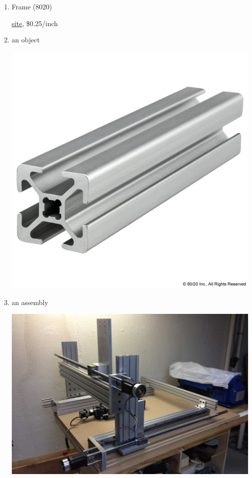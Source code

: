\documentclass[11pt]{article}
\begin{document}
\begin{enumerate}
\item Frame (8020)
\label{sec:org75d7a8b}

\href{https://8020.net/20-2020.html}{site}, \$0.25/inch


\item an object
\label{sec:orgd5b63a6}
\begin{center}
\includegraphics[width=.9\linewidth]{Hardware_needed/2022-07-18_13-11-55_screenshot.png}
\end{center}
\item an assembly
\label{sec:orgd8719cd}
\begin{center}
\includegraphics[width=.9\linewidth]{Hardware_needed/2022-07-18_13-13-15_screenshot.png}
\end{center}


\end{enumerate}
\end{document}
